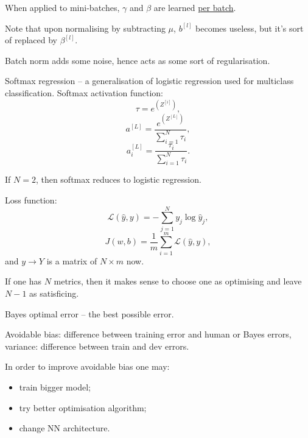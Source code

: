 \documentclass[a4paper,11pt]{article}
\begin{document}
When applied to mini-batches, \textcolor{OliveGreen}{$\gamma$} and \textcolor{OliveGreen}{$\beta$} are learned \underline{per batch}.

Note that upon normalising by subtracting \textcolor{OliveGreen}{$\mu$}, \textcolor{OliveGreen}{$b^{[l]}$} becomes useless, but it's sort of replaced by \textcolor{OliveGreen}{$\beta^{[l]}$}.

Batch norm adds some noise, hence acts as some sort of regularisation.

Softmax regression -- a generalisation of logistic regression used for multiclass classification. Softmax activation function:
\begin{equation}
\tau = e^{\left( Z^{[i]} \right)} ,
\end{equation}
\begin{equation}
a^{[L]} = \frac{e^{\left( Z^{[L]} \right)}}{\sum\limits_{i=1} ^N \tau_i} ,
\end{equation}
\begin{equation}
a_i ^{[L]} = \frac{\tau_i}{\sum\limits_{i=1} ^N \tau_i} .
\end{equation}

If \textcolor{OliveGreen}{$N = 2$}, then softmax reduces to logistic regression.

Loss function:
\begin{equation}
\mathcal{L} \left(\hat{y} , y \right) = - \sum_{j=1} ^N y_j \log \hat{y}_j ,
\end{equation}
\begin{equation}
J \left( w, b \right) = \frac{1}{m} \sum_{i=1} ^m \mathcal{L} \left(\hat{y} , y \right) ,
\end{equation}
and \textcolor{OliveGreen}{$y \rightarrow Y$} is a matrix of \textcolor{OliveGreen}{$N \times m$} now.

If one has \textcolor{OliveGreen}{$N$} metrics, then it makes sense to choose one as optimising and leave \textcolor{OliveGreen}{$N-1$} as satisficing.

Bayes optimal error -- the best possible error.

Avoidable bias: difference between training error and human or Bayes errors, variance: difference between train and dev errors.

In order to improve avoidable bias one may:
\begin{itemize}
\item train bigger model;
\item try better optimisation algorithm;
\item change NN architecture.
\end{itemize}
\end{document}
